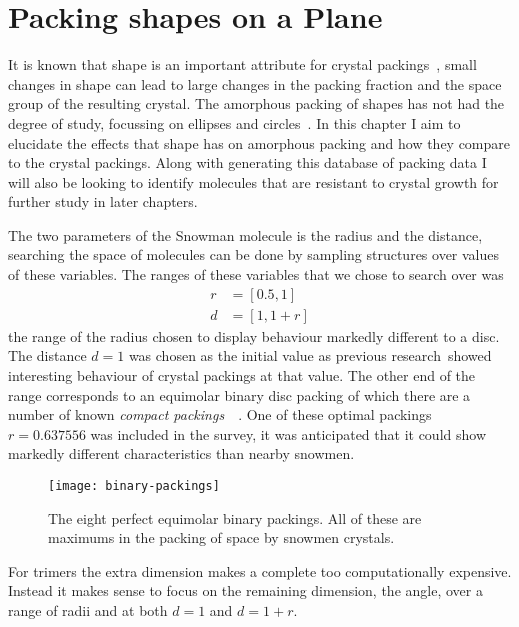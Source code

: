 \chapter{Packing shapes on a Plane}

It is known that shape is an important attribute for crystal packings~\tocite, small changes in shape can lead to large changes in the packing fraction and the space group of the resulting crystal. The amorphous packing of shapes has not had the degree of study, focussing on ellipses and circles~\tocite. In this chapter I aim to elucidate the effects that shape has on amorphous packing and how they compare to the crystal packings. Along with generating this database of packing data I will also be looking to identify molecules that are resistant to crystal growth for further study in later chapters.

The two parameters of the Snowman molecule is the radius and the distance, searching the space of molecules can be done by sampling structures over values of these variables. The ranges of these variables that we chose to search over was
\begin{align}
            r &= [0.5, 1] \\
            d &= [1,1+r]
\end{align}
the range of the radius chosen to display behaviour markedly different to a disc. The distance $d=1$ was chosen as the initial value as previous research~\tocite showed interesting behaviour of crystal packings at that value. The other end of the range corresponds to an equimolar binary disc packing of which there are a number of known \emph{compact packings}~~\cite{heppes:03,kennedy:06}. One of these optimal packings $r=0.637556$ was included in the survey, it was anticipated that it could show markedly different characteristics than nearby snowmen.

\begin{figure}
    \texttt{[image: binary-packings]}
    \caption[Perfect binary packings]{The eight perfect equimolar binary packings. All of these are maximums in the packing of space by snowmen crystals.}
    \label{fig:binary-packings}
\end{figure}

For trimers the extra dimension makes a complete too computationally expensive. Instead it makes sense to focus on the remaining dimension, the angle, over a range of radii and at both $d=1$ and $d=1+r$.


